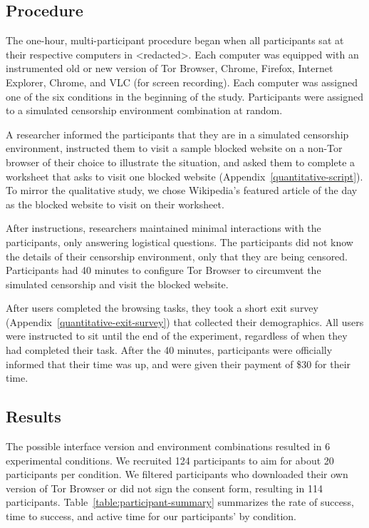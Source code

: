 \documentclass[USenglish,oneside,twocolumn]{article}
\begin{document}
{\subsection{Procedure}
The one-hour, multi-participant procedure began when all participants sat at their
respective computers in <redacted>. %
Each computer was equipped with an instrumented old or new version
of Tor Browser, Chrome, Firefox, Internet Explorer,  Chrome, and VLC (for screen recording).
Each computer was assigned one of the six conditions in the beginning of the study. Participants
were assigned to a simulated censorship environment combination at random. 

A researcher informed the participants that they are in a
simulated censorship environment, instructed them to visit a sample blocked website on a 
non-Tor browser of their choice to illustrate the situation, and asked them to 
complete a worksheet that asks to visit one blocked website (Appendix~\ref{quantitative-script}). 
To mirror the qualitative study, we chose Wikipedia's featured article of the day 
as the blocked website to visit on their worksheet. 

After instructions, researchers maintained minimal interactions with the participants, 
only answering logistical questions.
The participants did not know the details of their censorship environment,
only that they are being censored. Participants had 40 minutes to configure Tor Browser to 
circumvent the simulated censorship and visit the blocked website. 

After users completed the browsing tasks, they took a short exit survey (Appendix~\ref{quantitative-exit-survey})
that collected their demographics. All users were instructed to sit until the end of the experiment,
regardless of when they had completed their task. After the 40 minutes, 
participants were officially informed that their time was up, and were given their payment of 
\$30 for their time. 

\subsection{Results} 
The possible interface version and environment combinations resulted in 6 experimental conditions. We recruited 124 participants to aim for about 20 participants per condition. We filtered participants who downloaded their own version of Tor Browser or did not sign the consent form, resulting in 114 participants. Table~\ref{table:participant-summary} summarizes the rate of success, time to success, and active time for our participants' by condition. 

}
\end{document}
